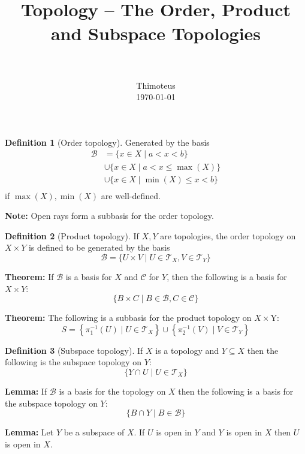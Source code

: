 \documentclass[paper=a4, fontsize=11pt]{scrartcl} %
\title{
    \usefont{OT1}{bch}{b}{n}
    \horrule{0.5pt} \\[0.4cm]
    \huge Topology -- The Order, Product and Subspace Topologies \\
    \horrule{2pt} \\[0.5cm]
}
\author{
    \normalfont                 \normalsize
        Thimoteus\\[-3pt]    \normalsize
        \today
}
\date{}
\newcommand{\script}{\mathcal}
\theoremstyle{definition}
\newtheorem*{defn}{Definition}
\numberwithin{equation}{section}    %
\numberwithin{figure}{section}      %
\numberwithin{table}{section}       %
\begin{document}
\maketitle

\begin{defn}[Order topology]
  Generated by the basis
  \begin{align*}
    \script B &=    \{ x \in X \mid a < x < b \} \\
              &\cup \{ x \in X \mid a < x \le \max(X) \} \\
              &\cup \{ x \in X \mid \min(X) \le x < b \} \\
  \end{align*}
  if $\max(X), \min(X)$ are well-defined.
\end{defn}

\textbf{Note:} Open rays form a subbasis for the order topology.

\hrulefill

\begin{defn}[Product topology]
  If $X, Y$ are topologies, the order topology on $X \times Y$ is defined to be
  generated by the basis
  \[ \script B = \{ U \times V \mid U \in \script T_X, V \in \script T_Y \} \]
\end{defn}

\textbf{Theorem:} If $\script B$ is a basis for $X$ and $\script C$ for $Y$, then
the following is a basis for $X \times Y$:
\[ \{ B \times C \mid B \in \script B, C \in \script C \} \]

\textbf{Theorem:} The following is a subbasis for the product topology on $X \times $Y:
\[ S = \left\{ \pi_1^{-1}(U) \mid U \in \script T_X \right\} \cup \left\{ \pi_2^{-1}(V) \mid V \in \script T_Y \right\} \]

\hrulefill

\begin{defn}[Subspace topology]
  If $X$ is a topology and $Y \subseteq X$ then the following is the subspace
  topology on $Y$:
  \[ \{ Y \cap U \mid U \in \script T_X \} \]
\end{defn}

\textbf{Lemma:} If $\script B$ is a basis for the topology on $X$ then the
following is a basis for the subspace topology on $Y$:
\[ \{ B \cap Y \mid B \in \script B \} \]

\textbf{Lemma:} Let $Y$ be a subspace of $X$. If $U$ is open in $Y$ and $Y$ is
open in $X$ then $U$ is open in $X$.

\hrulefill
\end{document}
